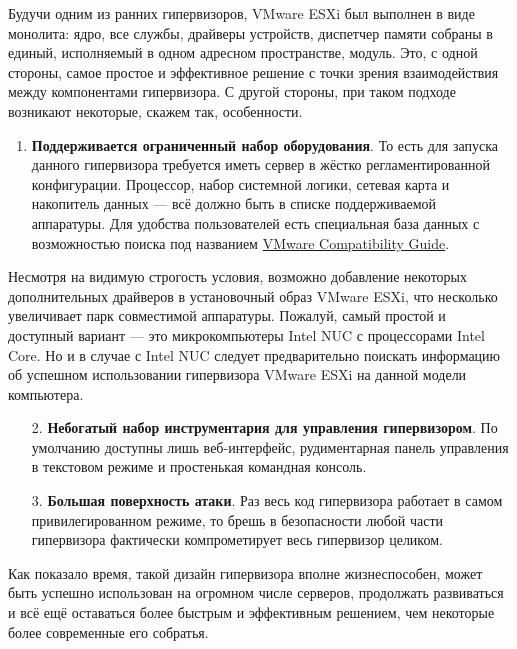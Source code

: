 \documentclass[14pt, a4paper]{article}
\begin{document}
Будучи одним из ранних гипервизоров, VMware ESXi был выполнен в виде монолита: ядро, все
службы, драйверы устройств, диспетчер памяти собраны в единый, исполняемый в одном адресном
пространстве, модуль. Это, с одной стороны, самое простое и эффективное решение с точки зрения
взаимодействия между компонентами гипервизора. С другой стороны, при таком подходе возникают
некоторые, скажем так, особенности.

\begin{enumerate}
    \item \textbf{Поддерживается ограниченный набор оборудования}. То есть для запуска данного
    гипервизора требуется иметь сервер в жёстко регламентированной конфигурации. Процессор,
    набор системной логики, сетевая карта и накопитель данных — всё должно быть в списке
    поддерживаемой аппаратуры. Для удобства пользователей есть специальная база данных с
    возможностью поиска под названием \href{https://www.vmware.com/resources/compatibility/search.php}{VMware Compatibility Guide}.
\end{enumerate}

Несмотря на видимую строгость условия, возможно добавление некоторых дополнительных
драйверов в установочный образ VMware ESXi, что несколько увеличивает парк совместимой
аппаратуры. Пожалуй, самый простой и доступный вариант — это микрокомпьютеры Intel NUC с
процессорами Intel Core. Но и в случае с Intel NUC следует предварительно поискать информацию об
успешном использовании гипервизора VMware ESXi на данной модели компьютера.

\begin{enumerate}
    \item[2.] \textbf{Небогатый набор инструментария для управления гипервизором}. По умолчанию
    доступны лишь веб-интерфейс, рудиментарная панель управления в текстовом режиме и
    простенькая командная консоль.
    \item[3.] \textbf{Большая поверхность атаки}. Раз весь код гипервизора работает в самом
    привилегированном режиме, то брешь в безопасности любой части гипервизора фактически
    компрометирует весь гипервизор целиком.
\end{enumerate}

Как показало время, такой дизайн гипервизора вполне жизнеспособен, может быть успешно
использован на огромном числе серверов, продолжать развиваться и всё ещё оставаться более
быстрым и эффективным решением, чем некоторые более современные его собратья.\\
\end{document}

